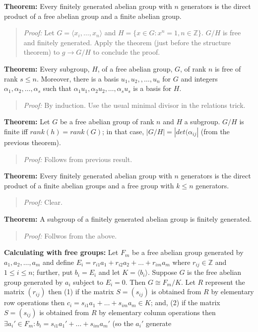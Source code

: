{\bf Theorem:}
Every finitely generated abelian group with $n$ generators is the direct product of a
free abelian group and a finite abelian group.
\begin{quote}
\emph{Proof:}  
Let $G= \langle x_i , \ldots ,x_n \rangle$ and $H= \{ x \in G: x^n=1, n \in {\mathbb Z} \}$.
$G/H$ is free and finitely generated.  Apply the theorem (just before the structure theorem)
to $g \rightarrow G/H$ to conclude the proof.
\end{quote}
{\bf Theorem:} Every subgroup, $H$, of a free abelian group, $G$, of rank $n$ is free of
rank $s \leq n$.
Moreover, there is a basis $u_1 , u_2 , , \ldots , u_n$ for $G$ and integers
$\alpha_1 , \alpha_2 , \ldots , \alpha_s$  such that
$\alpha_1 u_1 , \alpha_2 u_2 , \ldots , \alpha_s u_s$  is a basis for $H$.
\begin{quote}
\emph{Proof:}  By induction.  Use the usual minimal divisor in the relations trick.
\end{quote}
{\bf Theorem:}  Let $G$ be a free abelian group of rank $n$ and $H$ a subgroup.  $G/H$ is
finite iff $rank(h)=rank(G)$; in that case, $|G/H| = |det(\alpha_{ij}|$ (from the previous theorem).
\begin{quote}
\emph{Proof:} Follows from previous result.
\end{quote}
{\bf Theorem:} Every finitely generated abelian group with $n$ generators is the direct product of
a finite abelian groups and a free group with $k \leq n$ generators.
\begin{quote}
\emph{Proof:}   Clear.
\end{quote}
{\bf Theorem:}  A subgroup of a finitely generated abelian group is finitely generated.
\begin{quote}
\emph{Proof:} Follwos from the above.
\end{quote}
{\bf Calculating with free groups:}
Let $F_m$ be a free abelian group generated by $a_1 , a_2 , \ldots , a_m$ and
define $E_i= r_{i1} a_1 + r_{i2} a_2 + \ldots + r_{im} a_m$ where
$r_{ij} \in {\mathbb Z}$ and $1 \le i \le n$; further, put
$b_i= E_i$ and let $K= \langle b_i \rangle$.  
Suppose $G$ is the free abelian group generated
by $a_i$ subject to $E_i = 0$.  Then $G \cong F_m / K$.  Let $R$ represent the matrix
$(r_{ij})$ then 
(1) if the matrix $S=(s_{ij})$ is obtained from $R$ by elementary row operations then
$c_i= s_{i1} a_1 + \ldots + s_{im} a_m \in K$; and,
(2) if the matrix $S=(s_{ij})$ is obtained from $R$ by elementary column operations then
$\exists a_i' \in F_m: b_i= s_{i1} a_1' + \ldots + s_{im} a_m'$ (so the $a_i'$ generate
